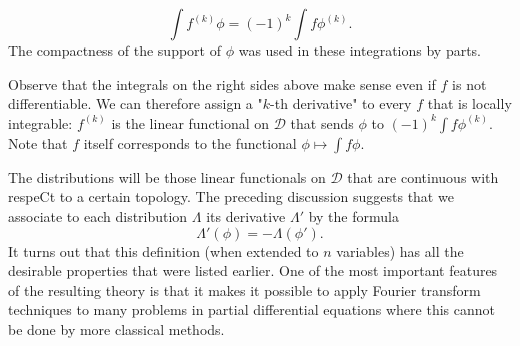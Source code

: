 \[\int f^{(k)}\phi=(-1)^k\int f\phi^{(k)}.\]
The compactness of the support of $\phi$ was used in these integrations by parts.\par
Observe that the integrals on the right sides above make sense even if $f$ is not differentiable. We can therefore assign a "$k$-th derivative" to every $f$ that is locally integrable: $f^{(k)}$ is the linear functional on $\mathscr{D}$ that sends $\phi$ to $(-1)^k\int f\phi^{(k)}$. Note that $f$ itself corresponds to the functional $\phi\mapsto\int f\phi$.\par
The distributions will be those linear functionals on $\mathscr{D}$ that are continuous with respeCt to a certain topology. The preceding discussion suggests that we associate to each distribution $\Lambda$ its  derivative $\Lambda'$ by the formula
\[\Lambda'(\phi)=-\Lambda(\phi').\]
It turns out that this definition (when extended to $n$ variables) has all the desirable properties that were listed earlier. One of the most important features of the resulting theory is that it makes it possible to apply Fourier transform techniques to many problems in partial differential equations where this cannot be done by more classical methods.
